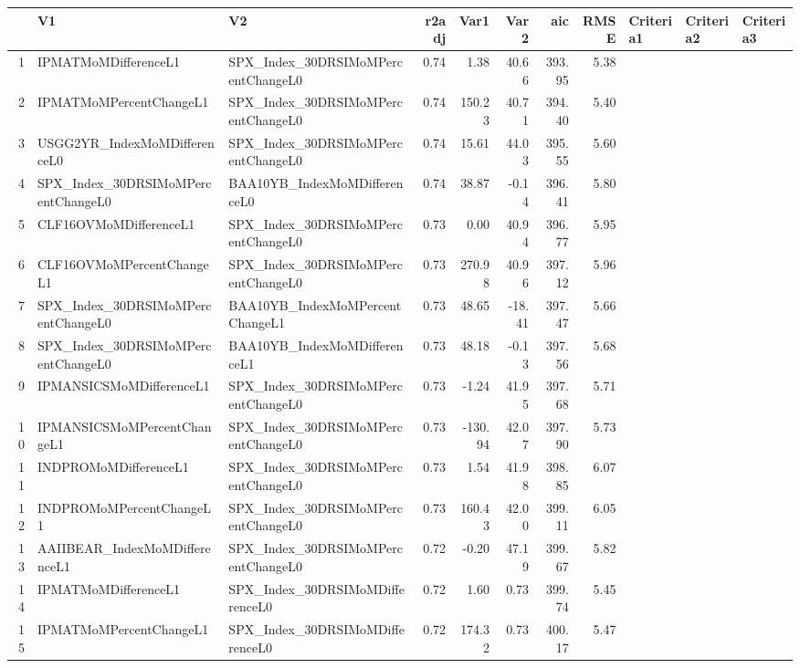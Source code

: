 \begin{longtable}{rllrrrrrlll}
  \hline
 & V1 & V2 & r2adj & Var1 & Var2 & aic & RMSE & Criteria1 & Criteria2 & Criteria3 \\ 
  \hline
1 & IPMATMoMDifferenceL1 & SPX\_Index\_30DRSIMoMPercentChangeL0 & 0.74 & 1.38 & 40.66 & 393.95 & 5.38 &  &  &  \\ 
  2 & IPMATMoMPercentChangeL1 & SPX\_Index\_30DRSIMoMPercentChangeL0 & 0.74 & 150.23 & 40.71 & 394.40 & 5.40 &  &  &  \\ 
  3 & USGG2YR\_IndexMoMDifferenceL0 & SPX\_Index\_30DRSIMoMPercentChangeL0 & 0.74 & 15.61 & 44.03 & 395.55 & 5.60 &  &  &  \\ 
  4 & SPX\_Index\_30DRSIMoMPercentChangeL0 & BAA10YB\_IndexMoMDifferenceL0 & 0.74 & 38.87 & -0.14 & 396.41 & 5.80 &  &  &  \\ 
  5 & CLF16OVMoMDifferenceL1 & SPX\_Index\_30DRSIMoMPercentChangeL0 & 0.73 & 0.00 & 40.94 & 396.77 & 5.95 &  &  &  \\ 
  6 & CLF16OVMoMPercentChangeL1 & SPX\_Index\_30DRSIMoMPercentChangeL0 & 0.73 & 270.98 & 40.96 & 397.12 & 5.96 &  &  &  \\ 
  7 & SPX\_Index\_30DRSIMoMPercentChangeL0 & BAA10YB\_IndexMoMPercentChangeL1 & 0.73 & 48.65 & -18.41 & 397.47 & 5.66 &  &  &  \\ 
  8 & SPX\_Index\_30DRSIMoMPercentChangeL0 & BAA10YB\_IndexMoMDifferenceL1 & 0.73 & 48.18 & -0.13 & 397.56 & 5.68 &  &  &  \\ 
  9 & IPMANSICSMoMDifferenceL1 & SPX\_Index\_30DRSIMoMPercentChangeL0 & 0.73 & -1.24 & 41.95 & 397.68 & 5.71 &  &  &  \\ 
  10 & IPMANSICSMoMPercentChangeL1 & SPX\_Index\_30DRSIMoMPercentChangeL0 & 0.73 & -130.94 & 42.07 & 397.90 & 5.73 &  &  &  \\ 
  11 & INDPROMoMDifferenceL1 & SPX\_Index\_30DRSIMoMPercentChangeL0 & 0.73 & 1.54 & 41.98 & 398.85 & 6.07 &  &  &  \\ 
  12 & INDPROMoMPercentChangeL1 & SPX\_Index\_30DRSIMoMPercentChangeL0 & 0.73 & 160.43 & 42.00 & 399.11 & 6.05 &  &  &  \\ 
  13 & AAIIBEAR\_IndexMoMDifferenceL1 & SPX\_Index\_30DRSIMoMPercentChangeL0 & 0.72 & -0.20 & 47.19 & 399.67 & 5.82 &  &  &  \\ 
  14 & IPMATMoMDifferenceL1 & SPX\_Index\_30DRSIMoMDifferenceL0 & 0.72 & 1.60 & 0.73 & 399.74 & 5.45 &  &  &  \\ 
  15 & IPMATMoMPercentChangeL1 & SPX\_Index\_30DRSIMoMDifferenceL0 & 0.72 & 174.32 & 0.73 & 400.17 & 5.47 &  &  &  \\ 

\end{longtable}
